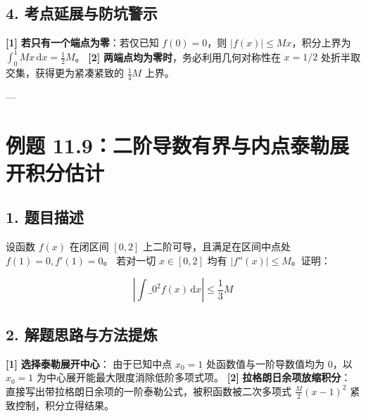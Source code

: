 \documentclass[11pt,a4paper,UTF8]{ctexart}
\begin{document}
\subsection{4. 考点延展与防坑警示}
\begin{solbox}[分步推导与答题规范]
\textbf{[1]}  \textbf{若只有一个端点为零}：若仅已知 $f(0)=0$，则 $|f(x)| \le Mx$，积分上界为 $\int_0^1 Mx\,\mathrm{d}x = \frac{1}{2}M$。
\textbf{[2]}  \textbf{两端点均为零时}，务必利用几何对称性在 $x = 1/2$ 处折半取交集，获得更为紧凑紧致的 $\frac{1}{4}M$ 上界。
\end{solbox}

---


\section{例题 11.9：二阶导数有界与内点泰勒展开积分估计}


\subsection{1. 题目描述}
设函数 $f(x)$ 在闭区间 $[0, 2]$ 上二阶可导，且满足在区间中点处 $f(1) = 0, f'(1) = 0$。
若对一切 $x \in [0, 2]$ 均有 $|f''(x)| \le M$。证明：

\begin{equation*}
\left| \int\_0^2 f(x)\,\mathrm{d}x \right| \le \frac{1}{3} M
\end{equation*}



\subsection{2. 解题思路与方法提炼}
\begin{solbox}[分步推导与答题规范]
\textbf{[1]}  \textbf{选择泰勒展开中心}：
由于已知中点 $x_0 = 1$ 处函数值与一阶导数值均为 $0$，以 $x_0 = 1$ 为中心展开能最大限度消除低阶多项式项。
\textbf{[2]}  \textbf{拉格朗日余项放缩积分}：
直接写出带拉格朗日余项的一阶泰勒公式，被积函数被二次多项式 $\frac{M}{2}(x-1)^2$ 紧致控制，积分立得结果。
\end{solbox}
\end{document}
